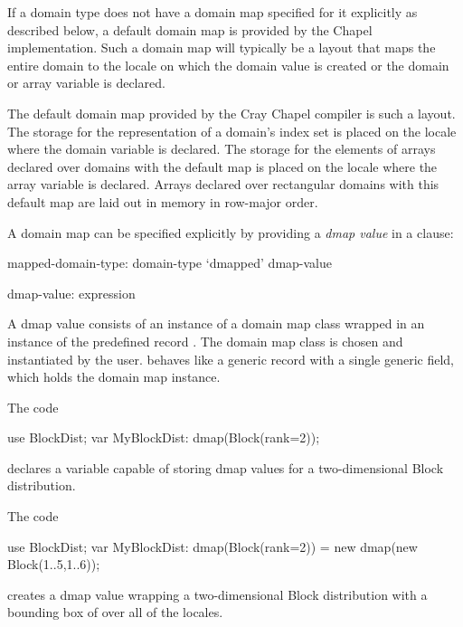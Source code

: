 If a domain type does not have a domain map specified for it
explicitly as described below,
a default domain map is provided by the Chapel implementation.
Such a domain map will typically be a layout that maps the entire domain
to the locale on which the domain value is created or
the domain or array variable is declared.

\begin{craychapel}
The default domain map provided by the Cray Chapel compiler
is such a layout. The storage for the representation of a domain's
index set is placed on the locale where the domain variable is declared.
The storage for the elements of arrays declared over domains with
the default map is placed on the locale where the array variable
is declared.
Arrays declared over rectangular domains with this default map
are laid out in memory in row-major order.
\end{craychapel}

A domain map can be specified explicitly by
providing a \emph{dmap value} in a  clause:

\begin{syntax}
mapped-domain-type:
  domain-type `dmapped' dmap-value

dmap-value:
  expression
\end{syntax}

A dmap value consists of an instance of a domain map class
wrapped in an instance of the predefined record .
The domain map class is chosen and instantiated by the user.
 behaves like a generic record with a single generic field,
which holds the domain map instance.

\begin{example}
The code
\begin{chapel}
use BlockDist;
var MyBlockDist: dmap(Block(rank=2));
\end{chapel}
declares a variable capable of storing dmap values
for a two-dimensional Block distribution.
\end{example}

\begin{example}
The code
\begin{chapel}
use BlockDist;
var MyBlockDist: dmap(Block(rank=2)) = new dmap(new Block({1..5,1..6}));
\end{chapel}
creates a dmap value wrapping a two-dimensional Block distribution with a
bounding box of  over all of the locales.
\end{example}

